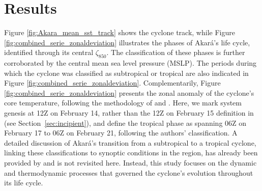 \documentclass[pdflatex,sn-chicago]{sn-jnl}%
\theoremstyle{plain}
\theoremstyle{definition}
\theoremstyle{remark}
\theoremstyle{definition}
\begin{document}
\section{Results}

Figure \ref{fig:Akara_mean_sst_track} shows the cyclone track, while Figure \ref{fig:combined_serie_zonaldeviation} illustrates the phases of Akará's life cycle, identified through its central $\zeta_{850}$. The classification of these phases is further corroborated by the central mean sea level pressure (MSLP). The periods during which the cyclone was classified as subtropical or tropical are also indicated in Figure \ref{fig:combined_serie_zonaldeviation}. Complementarily, Figure \ref{fig:combined_serie_zonaldeviation} presents the zonal anomaly of the cyclone's core temperature, following the methodology of \citet{reboita2021iba} and \citet{reboita2024assessment}. Here, we mark system genesis at 12Z on February 14, rather than the 12Z on February 15 definition in \citet{reboita2024assessment} (see Section~\ref{sec:incipient}), and define the tropical phase as spanning 06Z on February 17 to 06Z on February 21, following the authors’ classification. A detailed discussion of Akará's transition from a subtropical to a tropical cyclone, linking these classifications to synoptic conditions in the region, has already been provided by \citet{reboita2024assessment} and is not revisited here. Instead, this study focuses on the dynamic and thermodynamic processes that governed the cyclone's evolution throughout its life cycle.
\end{document}
